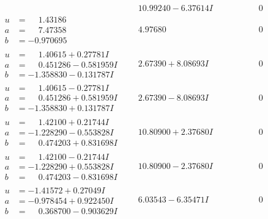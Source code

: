 \documentclass[1p]{elsarticle_modified}
\theoremstyle{definition}
\begin{document}
$$\begin{array}{c|c|c}
 & \phantom{-}10.99240 - 6.37614 I & \phantom{-0.000000 } 0 \\ \hline\begin{aligned}
u &= \phantom{-}1.43186\phantom{ +0.000000I} \\
a &= \phantom{-}7.47358\phantom{ +0.000000I} \\
b &= -0.970695\phantom{ +0.000000I}\end{aligned}
 & \phantom{-}4.97680\phantom{ +0.000000I} & \phantom{-0.000000 } 0 \\ \hline\begin{aligned}
u &= \phantom{-}1.40615 + 0.27781 I \\
a &= \phantom{-}0.451286 - 0.581959 I \\
b &= -1.358830 - 0.131787 I\end{aligned}
 & \phantom{-}2.67390 + 8.08693 I & \phantom{-0.000000 } 0 \\ \hline\begin{aligned}
u &= \phantom{-}1.40615 - 0.27781 I \\
a &= \phantom{-}0.451286 + 0.581959 I \\
b &= -1.358830 + 0.131787 I\end{aligned}
 & \phantom{-}2.67390 - 8.08693 I & \phantom{-0.000000 } 0 \\ \hline\begin{aligned}
u &= \phantom{-}1.42100 + 0.21744 I \\
a &= -1.228290 - 0.553828 I \\
b &= \phantom{-}0.474203 + 0.831698 I\end{aligned}
 & \phantom{-}10.80900 + 2.37680 I & \phantom{-0.000000 } 0 \\ \hline\begin{aligned}
u &= \phantom{-}1.42100 - 0.21744 I \\
a &= -1.228290 + 0.553828 I \\
b &= \phantom{-}0.474203 - 0.831698 I\end{aligned}
 & \phantom{-}10.80900 - 2.37680 I & \phantom{-0.000000 } 0 \\ \hline\begin{aligned}
u &= -1.41572 + 0.27049 I \\
a &= -0.978454 + 0.922450 I \\
b &= \phantom{-}0.368700 - 0.903629 I\end{aligned}
 & \phantom{-}6.03543 - 6.35471 I & \phantom{-0.000000 } 0 \\ \hline\begin{aligned}

\end{aligned}
\end{array}$$
\end{document}
